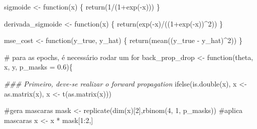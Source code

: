 \documentclass[
  a4paperpaper,
]{article}
\newenvironment{Shaded}{\begin{snugshade}}{\end{snugshade}}
\newcommand{\AttributeTok}[1]{\textcolor[rgb]{0.40,0.45,0.13}{#1}}
\newcommand{\CommentTok}[1]{\textcolor[rgb]{0.37,0.37,0.37}{#1}}
\newcommand{\ControlFlowTok}[1]{\textcolor[rgb]{0.00,0.23,0.31}{#1}}
\newcommand{\DecValTok}[1]{\textcolor[rgb]{0.68,0.00,0.00}{#1}}
\newcommand{\DocumentationTok}[1]{\textcolor[rgb]{0.37,0.37,0.37}{\textit{#1}}}
\newcommand{\FloatTok}[1]{\textcolor[rgb]{0.68,0.00,0.00}{#1}}
\newcommand{\FunctionTok}[1]{\textcolor[rgb]{0.28,0.35,0.67}{#1}}
\newcommand{\NormalTok}[1]{\textcolor[rgb]{0.00,0.23,0.31}{#1}}
\newcommand{\OtherTok}[1]{\textcolor[rgb]{0.00,0.23,0.31}{#1}}
\newcommand{\SpecialCharTok}[1]{\textcolor[rgb]{0.37,0.37,0.37}{#1}}
\begin{document}
\begin{Shaded}
\begin{Highlighting}[]
\NormalTok{sigmoide }\OtherTok{\textless{}{-}} \ControlFlowTok{function}\NormalTok{(x) \{}
  \FunctionTok{return}\NormalTok{(}\DecValTok{1}\SpecialCharTok{/}\NormalTok{(}\DecValTok{1}\SpecialCharTok{+}\FunctionTok{exp}\NormalTok{(}\SpecialCharTok{{-}}\NormalTok{x)))}
\NormalTok{\}}

\NormalTok{derivada\_sigmoide }\OtherTok{\textless{}{-}} \ControlFlowTok{function}\NormalTok{(x) \{}
  \FunctionTok{return}\NormalTok{(}\FunctionTok{exp}\NormalTok{(}\SpecialCharTok{{-}}\NormalTok{x)}\SpecialCharTok{/}\NormalTok{((}\DecValTok{1}\SpecialCharTok{+}\FunctionTok{exp}\NormalTok{(}\SpecialCharTok{{-}}\NormalTok{x))}\SpecialCharTok{\^{}}\DecValTok{2}\NormalTok{))}
\NormalTok{\}}

\NormalTok{mse\_cost }\OtherTok{\textless{}{-}} \ControlFlowTok{function}\NormalTok{(y\_true, y\_hat) \{}
  \FunctionTok{return}\NormalTok{(}\FunctionTok{mean}\NormalTok{((y\_true }\SpecialCharTok{{-}}\NormalTok{ y\_hat)}\SpecialCharTok{\^{}}\DecValTok{2}\NormalTok{))}
\NormalTok{\}}

\CommentTok{\# para as epochs, é necessário rodar um for}
\NormalTok{back\_prop\_drop }\OtherTok{\textless{}{-}} \ControlFlowTok{function}\NormalTok{(theta, x, y, }\AttributeTok{p\_masks =} \FloatTok{0.6}\NormalTok{)\{}

  \DocumentationTok{\#\#\# Primeiro, deve{-}se realizar o forward propagation}
  \FunctionTok{ifelse}\NormalTok{(}\FunctionTok{is.double}\NormalTok{(x), x }\OtherTok{\textless{}{-}} \FunctionTok{as.matrix}\NormalTok{(x), x }\OtherTok{\textless{}{-}} \FunctionTok{t}\NormalTok{(}\FunctionTok{as.matrix}\NormalTok{(x)))}
  
    \CommentTok{\#gera mascaras}
\NormalTok{    mask }\OtherTok{\textless{}{-}} \FunctionTok{replicate}\NormalTok{(}\FunctionTok{dim}\NormalTok{(x)[}\DecValTok{2}\NormalTok{],}\FunctionTok{rbinom}\NormalTok{(}\DecValTok{4}\NormalTok{, }\DecValTok{1}\NormalTok{, p\_masks))}
    \CommentTok{\#aplica mascaras}
\NormalTok{    x }\OtherTok{\textless{}{-}}\NormalTok{ x }\SpecialCharTok{*}\NormalTok{ mask[}\DecValTok{1}\SpecialCharTok{:}\DecValTok{2}\NormalTok{,]}
  

\end{Highlighting}
\end{Shaded}
\end{document}
